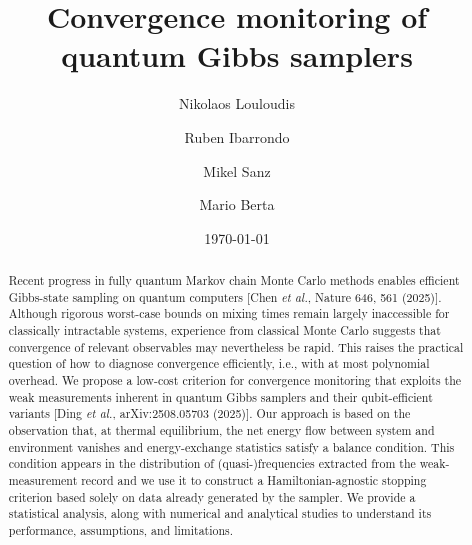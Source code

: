 \documentclass[showpacs,amsmath,amssymb,twocolumn,prx,superscriptaddress,10pt,aps,nofootinbib]{revtex4-2}
\begin{document}
\title{Convergence monitoring of quantum Gibbs samplers}

\author{Nikolaos Louloudis}

\author{Ruben Ibarrondo}

\author{Mikel Sanz}



\author{Mario Berta}

\date{\today}


\begin{abstract}
Recent progress in fully quantum Markov chain Monte Carlo methods enables efficient Gibbs-state sampling on quantum computers [Chen {\it et al.}, Nature 646, 561 (2025)]. Although rigorous worst-case bounds on mixing times remain largely inaccessible for classically intractable systems, experience from classical Monte Carlo suggests that convergence of relevant observables may nevertheless be rapid. This raises the practical question of how to diagnose convergence efficiently, i.e., with at most polynomial overhead. We propose a low-cost criterion for convergence monitoring that exploits the weak measurements inherent in quantum Gibbs samplers and their qubit-efficient variants [Ding {\it et al.}, arXiv:2508.05703 (2025)]. Our approach is based on the observation that, at thermal equilibrium, the net energy flow between system and environment vanishes and energy-exchange statistics satisfy a balance condition. This condition appears in the distribution of (quasi-)frequencies extracted from the weak-measurement record and we use it to construct a Hamiltonian-agnostic stopping criterion based solely on data already generated by the sampler. We provide a statistical analysis, along with numerical and analytical studies to understand its performance, assumptions, and limitations.
\end{abstract}
\end{document}
